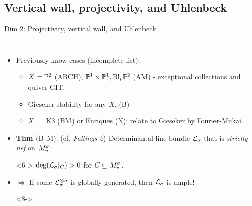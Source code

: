 \documentclass[8pt]{beamer} %
\begin{document}
\subsection{{\color{purple} Vertical wall, projectivity, and Uhlenbeck}}
\begin{frame}[fragile]{Dim 2: Projectivity, vertical wall, and Uhlenbeck}
    \begin{columns}[t]
        \begin{itemize}
            \item<2-> Previously know cases (incomplete list):
            \begin{itemize}
                \item<3-> $X = \mathbb{P}^2$ {\footnotesize (ABCH)}, $\mathbb{P}^1 \times \mathbb{P}^1, \text{Bl}_p \mathbb{P}^2$ {\footnotesize (AM)} - exceptional collections and quiver GIT.
                \item<4-> Gieseker stability for any $X$. {\footnotesize (B)}
                \item<5-> $X = $ K3 {\footnotesize (BM)} or Enriques {\footnotesize (N)}: relate to Gieseker by Fourier-Mukai.
            \end{itemize}
        \item<6-> \textbf{Thm} (B--M): (cf. \textit{Faltings 2}) Determinantal line bundle $\mathcal{L}_\sigma$ that is \textit{strictly nef} on $M^\sigma_v$: %
        \item[]<6-> $\deg(\mathcal{L}_\sigma|_C) > 0$ for $C \subseteq M^\sigma_v$.
        \item<7-> $\Rightarrow$ If some $\mathcal{L}_\sigma^{\otimes n}$ is globally generated, then $\mathcal{L}_\sigma$ is ample!
        \item[]
        \item[]<8->
        \begin{center}
\end{center}
\end{itemize}
\end{columns}
\end{frame}
\end{document}
